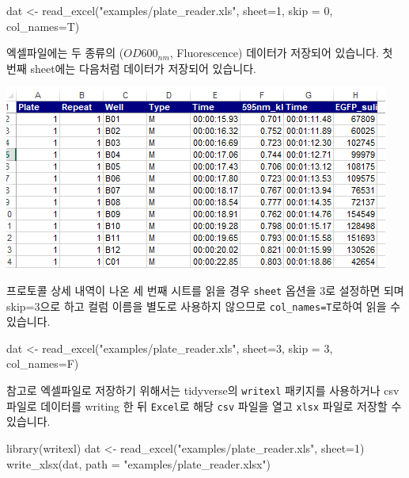 \documentclass[
  a4paper,
]{book}
\newenvironment{Shaded}{\begin{snugshade}}{\end{snugshade}}
\newcommand{\AttributeTok}[1]{\textcolor[rgb]{0.40,0.45,0.13}{#1}}
\newcommand{\DecValTok}[1]{\textcolor[rgb]{0.68,0.00,0.00}{#1}}
\newcommand{\FunctionTok}[1]{\textcolor[rgb]{0.28,0.35,0.67}{#1}}
\newcommand{\NormalTok}[1]{\textcolor[rgb]{0.00,0.23,0.31}{#1}}
\newcommand{\OtherTok}[1]{\textcolor[rgb]{0.00,0.23,0.31}{#1}}
\newcommand{\StringTok}[1]{\textcolor[rgb]{0.13,0.47,0.30}{#1}}
\begin{document}
\begin{Shaded}
\begin{Highlighting}[]
\NormalTok{dat }\OtherTok{\textless{}{-}} \FunctionTok{read\_excel}\NormalTok{(}\StringTok{"examples/plate\_reader.xls"}\NormalTok{, }\AttributeTok{sheet=}\DecValTok{1}\NormalTok{, }\AttributeTok{skip =} \DecValTok{0}\NormalTok{, }\AttributeTok{col\_names=}\NormalTok{T)}
\end{Highlighting}
\end{Shaded}

엑셀파일에는 두 종류의 (\(OD600_{nm}\), Fluorescence) 데이터가 저장되어
있습니다. 첫 번째 sheet에는 다음처럼 데이터가 저장되어 있습니다.

\includegraphics{images/04/excelfile01.PNG}

프로토콜 상세 내역이 나온 세 번째 시트를 읽을 경우 \texttt{sheet} 옵션을
3로 설정하면 되며 skip=3으로 하고 컬럼 이름을 별도로 사용하지 않으므로
\texttt{col\_names=T}로하여 읽을 수 있습니다.

\begin{Shaded}
\begin{Highlighting}[]
\NormalTok{dat }\OtherTok{\textless{}{-}} \FunctionTok{read\_excel}\NormalTok{(}\StringTok{"examples/plate\_reader.xls"}\NormalTok{, }\AttributeTok{sheet=}\DecValTok{3}\NormalTok{, }\AttributeTok{skip =} \DecValTok{3}\NormalTok{, }\AttributeTok{col\_names=}\NormalTok{F)}
\end{Highlighting}
\end{Shaded}

참고로 엑셀파일로 저장하기 위해서는 tidyverse의 \texttt{writexl}
패키지를 사용하거나 csv 파일로 데이터를 writing 한 뒤 \texttt{Excel}로
해당 \texttt{csv} 파일을 열고 \texttt{xlsx} 파일로 저장할 수 있습니다.

\begin{Shaded}
\begin{Highlighting}[]
\FunctionTok{library}\NormalTok{(writexl)}
\NormalTok{dat }\OtherTok{\textless{}{-}} \FunctionTok{read\_excel}\NormalTok{(}\StringTok{"examples/plate\_reader.xls"}\NormalTok{, }\AttributeTok{sheet=}\DecValTok{1}\NormalTok{)}
\FunctionTok{write\_xlsx}\NormalTok{(dat, }\AttributeTok{path =} \StringTok{"examples/plate\_reader.xlsx"}\NormalTok{)}
\end{Highlighting}
\end{Shaded}
\end{document}
